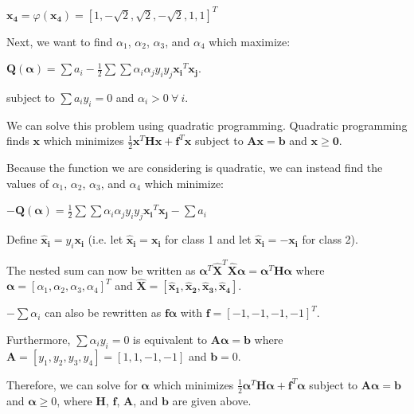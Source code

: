 \documentclass[fleqn]{article}
\begin{document}
\begin{enumerate}
	$\mathbf{x_4} = \varphi(\mathbf{x_4}) = [1,-\sqrt{2},\sqrt{2},-\sqrt{2},1,1]^T$
	
	Next, we want to find $\alpha_1$, $\alpha_2$, $\alpha_3$, and $\alpha_4$ which maximize:
	
	$\mathbf{Q(\boldsymbol{\alpha})} = \sum{a_i} - \frac{1}{2}\sum{\sum{\alpha_i\alpha_jy_iy_j\mathbf{x_i}^T\mathbf{x_j}}}$.
	
	subject to $\sum{a_iy_i} = 0$ and $\alpha_i > 0\ \forall\ i$.
	
	We can solve this problem using quadratic programming. Quadratic programming finds $\mathbf{x}$ which minimizes $\frac{1}{2}\mathbf{x}^T\mathbf{H}\mathbf{x} + \mathbf{f}^T\mathbf{x}$ subject to $\mathbf{Ax} = \mathbf{b}$ \newline and $\mathbf{x} \geq \mathbf{0}$.

	Because the function we are considering is quadratic, we can instead find the values of $\alpha_1$, $\alpha_2$, $\alpha_3$, and $\alpha_4$ which minimize:
	
	$-\mathbf{Q(\boldsymbol{\alpha})} = \frac{1}{2}\sum{\sum{\alpha_i\alpha_jy_iy_j\mathbf{x_i}^T\mathbf{x_j}}} - \sum{a_i}$
	
	Define $\mathbf{\hat{x}_i} = y_i\mathbf{x_i}$ (i.e. let $\mathbf{\hat{x}_i} = \mathbf{x_i}$ for class 1 and let $\mathbf{\hat{x}_i} = -\mathbf{x_i}$ for class 2).
	
	The nested sum can now be written as $\boldsymbol{\alpha}^T\mathbf{\hat{X}}^T\mathbf{\hat{X}}\boldsymbol{\alpha} = \boldsymbol{\alpha}^T\mathbf{H}\boldsymbol{\alpha}$ \newline where $\boldsymbol{\alpha} = [\alpha_1,\alpha_2,\alpha_3,\alpha_4]^T$ and $\mathbf{\hat{X}} = [\mathbf{\hat{x}_1},\mathbf{\hat{x}_2}, \mathbf{\hat{x}_3}, \mathbf{\hat{x}_4}]$.
	
	$-\sum{\alpha_i}$ can also be rewritten as $\mathbf{f}\boldsymbol{\alpha}$ with $\mathbf{f} = [-1,-1,-1,-1]^T$.
	  
	Furthermore, $\sum{\alpha_iy_i} = 0$ is equivalent to $\mathbf{A}\boldsymbol{\alpha} = \mathbf{b}$ where \newline $\mathbf{A} = [y_1,y_2,y_3,y_4] = [1,1,-1,-1]$ and $\mathbf{b} = 0$.
	
	Therefore, we can solve for $\boldsymbol{\alpha}$ which minimizes $\frac{1}{2}\boldsymbol{\alpha}^T\mathbf{H}\boldsymbol{\alpha} + \mathbf{f}^T\boldsymbol{\alpha}$ subject to $\mathbf{A}\boldsymbol{\alpha} = \mathbf{b}$ and $\boldsymbol{\alpha} \geq 0$, where $\mathbf{H}$, $\mathbf{f}$, $\mathbf{A}$, and $\mathbf{b}$ are given above.
	

\end{enumerate}
\end{document}
